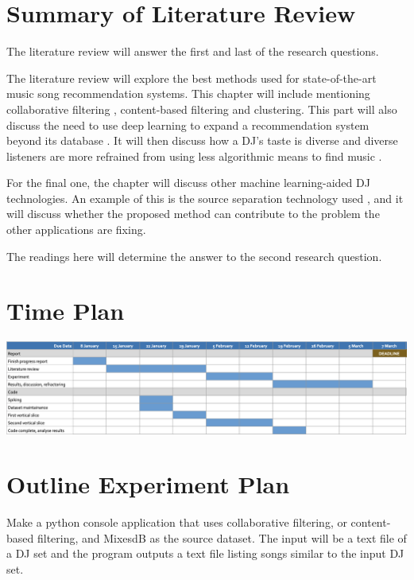 \documentclass[11pt,titlepage,oneside]{book}
\begin{document}
	
\section{Summary of Literature Review}
\begin{flushleft}
	The literature review will answer the first and last of the research questions.
\end{flushleft}
\begin{flushleft}
	The literature review will explore the best methods used for state-of-the-art music song recommendation systems. This chapter will include mentioning collaborative filtering \citep{chow_music_2020-1}, content-based filtering \citep{chang_building_2021} and clustering\citep{piyush_building_2019}. This part will also discuss the need to use deep learning to expand a recommendation system beyond its database \citep{chow_music_2020}. It will then discuss how a DJ's taste is diverse and diverse listeners are more refrained from using less algorithmic means to find music \citep{anderson_algorithmic_2020}.
\end{flushleft}
\begin{flushleft}
	For the final one, the chapter will discuss other machine learning-aided DJ technologies. An example of this is the source separation technology used \citep{kirn_review_2023}, and it will discuss whether the proposed method can contribute to the problem the other applications are fixing.
\end{flushleft}
\begin{flushleft}
	The readings here will determine the answer to the second research question.
	
\end{flushleft}

\section{Time Plan}

\includegraphics[width=\columnwidth]{timePlan}



\section{Outline Experiment Plan}
Make a python console application that uses collaborative filtering, or content-based filtering, and MixesdB as the source dataset. The input will be a text file of a DJ set and the program outputs a text file listing songs similar to the input DJ set.
\end{document}
